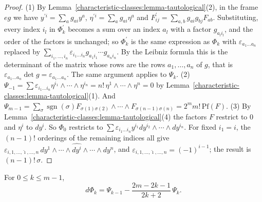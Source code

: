 \begin{proof}
(1) By Lemma~\ref{characteristic-classes:lemma-tautological}(2), in the frame $eg$ we have $y^{\prime i} = \sum_ag_{ai}y^a$, $\eta^{\prime i} = \sum_ag_{ai}\eta^a$ and
$F^{\prime}_{ij} = \sum_{a,b}g_{ai}g_{bj}F_{ab}$. Substituting, every index $i_l$ in $\Phi^{\prime}_k$ becomes a sum over an index $a_l$ with a factor $g_{a_li_l}$, and the order of the
factors is unchanged; so $\Phi^{\prime}_k$ is the same expression as $\Phi_k$ with $\varepsilon_{a_1 \ldots a_n}$ replaced by $\sum_{i_1, \ldots, i_n}\varepsilon_{i_1 \ldots i_n}g_{a_1i_1} \cdots g_{a_ni_n}$.
By the Leibniz formula this is the determinant of the matrix whose rows are the rows $a_1, \ldots, a_n$ of $g$, that is $\varepsilon_{a_1 \ldots a_n}\det g = \varepsilon_{a_1 \ldots a_n}$. The same
argument applies to $\Psi_k$.
(2) $\Psi_{-1} = \sum\varepsilon_{i_1 \ldots i_n}\eta^{i_1} \wedge \cdots \wedge \eta^{i_n} = n!\,\eta^1 \wedge \cdots \wedge \eta^n = 0$ by Lemma~\ref{characteristic-classes:lemma-tautological}(1). And
$\Psi_{m-1} = \sum_\sigma\operatorname{sgn}(\sigma)F_{\sigma(1)\sigma(2)} \wedge \cdots \wedge F_{\sigma(n-1)\sigma(n)} = 2^mm!\,\mathrm{Pf}(F)$.
(3) By Lemma~\ref{characteristic-classes:lemma-tautological}(4) the factors $F$ restrict to $0$ and $\eta^i$ to $dy^i$. So $\Phi_0$ restricts to
$\sum\varepsilon_{i_1 \ldots i_n}y^{i_1}dy^{i_2} \wedge \cdots \wedge dy^{i_n}$. For fixed $i_1 = i$, the $(n-1)!$ orderings of the remaining indices all give
$\varepsilon_{i,1, \ldots, \hat{\imath}, \ldots, n}\,dy^1 \wedge \cdots \wedge \widehat{dy^i} \wedge \cdots \wedge dy^n$, and $\varepsilon_{i,1, \ldots, \hat{\imath}, \ldots, n} = (-1)^{i-1}$; the result is
$(n-1)!\,\sigma$.
\end{proof}

\begin{lemma}[Chern]\label{characteristic-classes:lemma-transgression}
For $0 \leq k \leq m - 1$,
\[
d\Phi_k = \Psi_{k-1} - \frac{2m - 2k - 1}{2k + 2}\,\Psi_k .
\]
\end{lemma}

